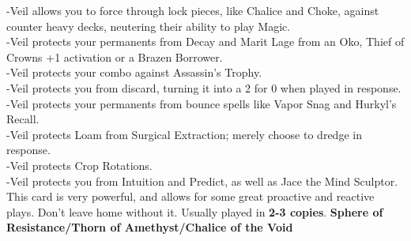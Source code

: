 \documentclass{report}
\begin{document}
	-Veil allows you to force through lock pieces, like Chalice and Choke, against counter heavy decks, neutering their ability to play Magic.\\
	-Veil protects your permanents from Decay and Marit Lage from an Oko, Thief of Crowns +1 activation or a Brazen Borrower.\\
	-Veil protects your combo against Assassin's Trophy.\\
	-Veil protects you from discard, turning it into a 2 for 0 when played in response.\\
	-Veil protects your permanents from bounce spells like Vapor Snag and Hurkyl's Recall.\\
	-Veil protects Loam from Surgical Extraction; merely choose to dredge in response.\\
	-Veil protects Crop Rotations.\\
	-Veil protects you from Intuition and Predict, as well as Jace the Mind Sculptor.\\
This card is very powerful, and allows for some great proactive and reactive plays. Don't leave home without it. Usually played in \textbf{2-3 copies}.
\newpage
\textbf{Sphere of Resistance/Thorn of Amethyst/Chalice of the Void}
\end{document}
